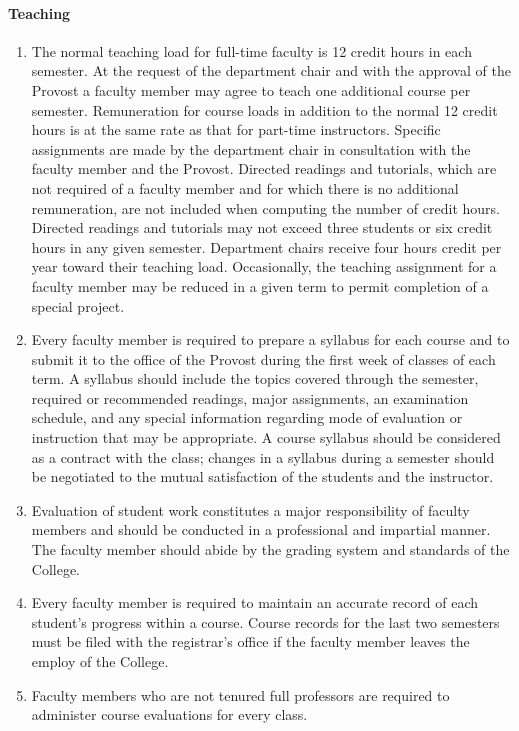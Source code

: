 			\paragraph{Teaching}
				\begin{enumerate}[label=\alph*)]
					\item{The normal teaching load for full-time faculty is 12 credit hours in each semester.  At the request of the department chair and with the approval of the Provost a faculty member may agree to teach one additional course per semester.  Remuneration for course loads in addition to the normal 12 credit hours is at the same rate as that for part-time instructors.  Specific assignments are made by the department chair in consultation with the faculty member and the Provost.  Directed readings and tutorials, which are not required of a faculty member and for which there is no additional remuneration, are not included when computing the number of credit hours.  Directed readings and tutorials may not exceed three students or six credit hours in any given semester.  Department chairs receive four hours credit per year toward their teaching load.  Occasionally, the teaching assignment for a faculty member may be reduced in a given term to permit completion of a special project.}
					\item{Every faculty member is required to prepare a syllabus for each course and to submit it to the office of the Provost during the first week of classes of each term.  A syllabus should include the topics covered through the semester, required or recommended readings, major assignments, an examination schedule, and any special information regarding mode of evaluation or instruction that may be appropriate.  A course syllabus should be considered as a contract with the class; changes in a syllabus during a semester should be negotiated to the mutual satisfaction of the students and the instructor.}
					\item{Evaluation of student work constitutes a major responsibility of faculty members and should be conducted in a professional and impartial manner.  The faculty member should abide by the grading system and standards of the College.}
					\item{Every faculty member is required to maintain an accurate record of each student's progress within a course.  Course records for the last two semesters must be filed with the registrar's office if the faculty member leaves the employ of the College.}
					\item{Faculty members who are not tenured full professors are required to administer course evaluations for every class.}
				\end{enumerate}
